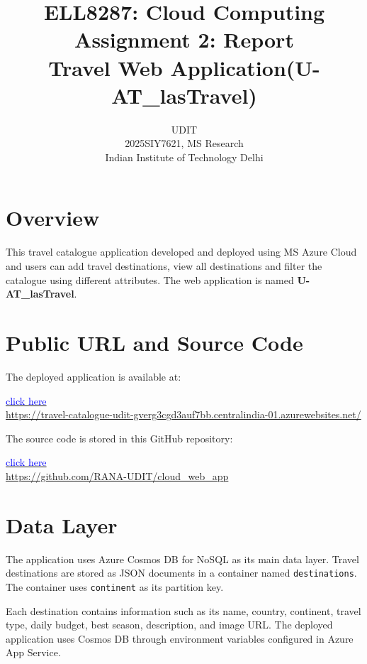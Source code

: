 \documentclass[12pt,a4paper]{article}
\title{ELL8287: Cloud Computing \\
Assignment 2: Report\\
Travel Web Application(U-AT\_lasTravel)}
\author{UDIT\\2025SIY7621, MS Research\\
Indian Institute of Technology Delhi}
\date{}
\begin{document}
\maketitle
\tableofcontents
\newpage

\section{Overview}

This travel catalogue application developed and deployed using MS Azure Cloud and users can add travel destinations, view all destinations and filter the catalogue using different attributes. The web application is named \textbf{U-AT\_lasTravel}.

\section{Public URL and Source Code}

The deployed application is available at:

\begin{center}
\href{https://travel-catalogue-udit-gverg3cgd3auf7bb.centralindia-01.azurewebsites.net/}
     {\textcolor{blue}{click here}}\\[0.5em]
\small\url{https://travel-catalogue-udit-gverg3cgd3auf7bb.centralindia-01.azurewebsites.net/}
\end{center}

The source code is stored in this GitHub repository:

\begin{center}
\href{https://github.com/RANA-UDIT/cloud_web_app}
     {\textcolor{blue}{click here}}\\[0.5em]
\small\url{https://github.com/RANA-UDIT/cloud_web_app}
\end{center}


\section{Data Layer}

The application uses Azure Cosmos DB for NoSQL as its main data layer. Travel destinations are stored as JSON documents in a container named \texttt{destinations}. The container uses \texttt{continent} as its partition key.

Each destination contains information such as its name, country, continent, travel type, daily budget, best season, description, and image URL. The deployed application uses Cosmos DB through environment variables configured in Azure App Service.
\end{document}

